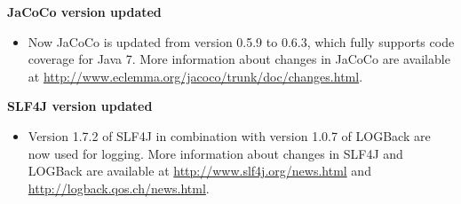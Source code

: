 \textbf{JaCoCo version updated}
\begin{itemize}
\item Now JaCoCo is updated from version 0.5.9 to 0.6.3, which fully supports
    code coverage for Java 7. More information about changes in JaCoCo are
    available at
    \url{http://www.eclemma.org/jacoco/trunk/doc/changes.html}.
\end{itemize}

\textbf{SLF4J version updated}
\begin{itemize}
\item Version 1.7.2 of SLF4J in combination with version 1.0.7 of LOGBack
    are now used for logging. More information about changes in SLF4J and
    LOGBack are available at
    \url{http://www.slf4j.org/news.html} and
    \url{http://logback.qos.ch/news.html}.
\end{itemize}
